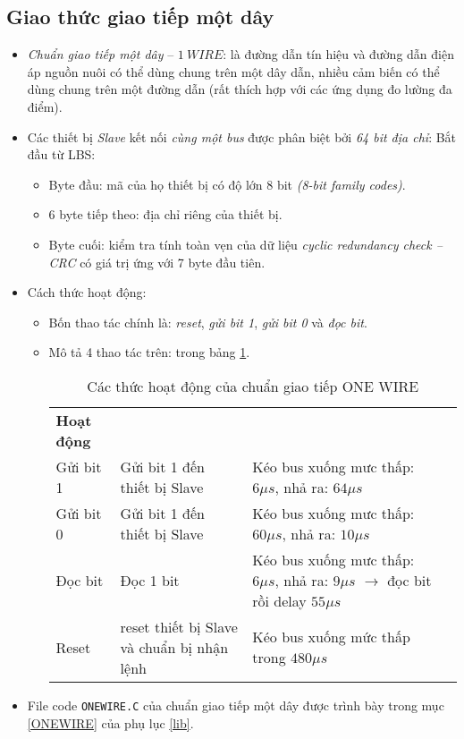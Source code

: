 \subsection{Giao thức giao tiếp một dây}
\begin{itemize}
\item \textit{Chuẩn giao tiếp một dây} -- $1 ~ WIRE$: là đường dẫn tín hiệu và đường dẫn điện áp nguồn nuôi có thể dùng chung trên một dây dẫn, nhiều cảm biến có thể dùng chung trên một đường dẫn (rất thích hợp với các ứng dụng đo lường đa điểm).
\item Các thiết bị \textit{Slave} kết nối \textit{cùng một bus} được phân biệt bởi \textit{64 bit địa chỉ}: Bắt đầu từ LBS:
\begin{itemize}
\item Byte đầu: mã của họ thiết bị có độ lớn 8 bit \textit{(8-bit family codes)}.
\item 6 byte tiếp theo: địa chỉ riêng của thiết bị.
\item Byte cuối: kiểm tra tính toàn vẹn của dữ liệu \textit{cyclic redundancy check -- CRC} có giá trị ứng với 7 byte đầu tiên.
\end{itemize}
\item Cách thức hoạt động:
\begin{itemize}
\item Bốn thao tác chính là: \textit{reset}, \textit{gửi bit 1}, \textit{gửi bit 0} và \textit{đọc bit}.
\item Mô tả 4 thao tác trên: trong bảng \ref{Tab:cach-thuc-hoat-dong-cua-chuan-1day}.
\begin{table}[h]
\begin{center}
\begin{tabular}{|l|p{4.5cm}|p{5cm}|l}\cline{1-3}
\textbf{Hoạt động} & \centering{\textbf{Mô tả}} & \centering{\textbf{Thực thi}} & \\ \cline{1-3}
Gửi bit 1 & Gửi bit 1 đến thiết bị Slave & Kéo bus xuống mưc thấp: $6\mu s$, nhả ra: $64 \mu s$ & \\ \cline{1-3}
Gửi bit 0 & Gửi bit 1 đến thiết bị Slave & Kéo bus xuống mưc thấp: $60\mu s$, nhả ra: $10 \mu s$ & \\ \cline{1-3}
Đọc bit & Đọc 1 bit & Kéo bus xuống mưc thấp: $6\mu s$, nhả ra: $9 \mu s$ $\longrightarrow$ đọc bit rồi delay $55\mu s$ & \\ \cline{1-3}
Reset & reset thiết bị Slave và chuẩn bị nhận lệnh & Kéo bus xuống mức thấp trong $480\mu s$ & \\ \cline{1-3}
\end{tabular}
\end{center}
\caption{Các thức hoạt động của chuẩn giao tiếp ONE WIRE} \label{Tab:cach-thuc-hoat-dong-cua-chuan-1day}
\end{table}
\end{itemize}
\item File code \verb|ONEWIRE.C| của chuẩn giao tiếp một dây được trình bày trong mục \ref{ONEWIRE} của phụ lục \ref{lib}.
\end{itemize}
\newpage
